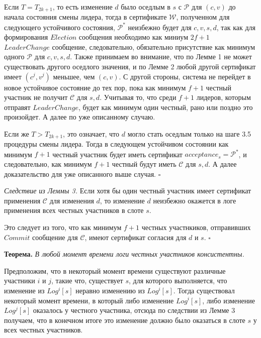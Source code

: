 Если $T= T_{2k+1}$, то есть изменение $d$ было оседлым в $s$ с $\mathcal{P}$ для $(c, v)$ до начала состояния смены лидера, тогда в сертификате $\mathcal{W}$, полученном для следующего устойчивого состояния, $\mathcal{P}^{*}$ неизбежно будет для $c, v, s, d$, так как для формирования $Election$ сообщения необходимо как миниум $2f+1$ $LeaderChange$ сообщение, следовательно, обязательно присутствие как минимум одного $\mathcal{P}$ для $c, v, s, d$. Также принимаем во внимание, что по Лемме 1 не может существовать другого оседлого значения, и по Лемме 2 любой другой сертификат имеет $(c^j, v^j)$ меньшее, чем $(c, v)$. С другой стороны, система не перейдет в новое устойчивое состояние до тех пор, пока как минимум $f+1$ честный участник не получит $\mathcal{C}$ для $s, d$. Учитывая то, что среди $f+1$ лидеров, которым отправят $LeaderChange$, будет как минимум один честный, рано или поздно это произойдет. А далее по уже описанному случаю.

Если же  $T > T_{2k+1}$, это означает, что $d$ могло стать оседлым только на шаге 3.5 процедуры смены лидера. Тогда в следующем устойчивом состоянии как минимум $f+1$ честный участник будет иметь сертификат $acceptance_s = \mathcal{P}^{*}$, и следовательно, как минимум $f+1$ честный будут иметь $\mathcal{C}$ для $s, d$. А далее доказательство для уже описанного выше случая.
$\square$
\vspace{10pt}

\textit{Следствие из Леммы 3.} Если хотя бы один честный участник имеет сертификат применения $\mathcal{C}$ для изменения $d$, то  изменение $d$ неизбежно окажется в логе применения всех честных участников в слоте $s$. 

Это следует из того, что как минимум $f+1$ честных участнкиков, отправивших $Commit$ сообщение для $\mathcal{C}$, имеют сертификат согласия для $d$ и $s$. $\square$
\vspace{10pt}

\textbf{Теорема.} \textit{В любой момент времени логи честных участников консистентны.}

Предположим, что в некоторый момент времени существуют различные участники $i$ и $j$, такие что, существует $s$, для которого выполняется, что изменение из $Log^i[s]$ неравно изменению из $Log^i[s]$. Тогда существовал некоторый момент времени, в который либо изменение $Log^i[s]$, либо изменение $Log^j[s]$ оказалось у честного участника, отсюда по следствии из Лемме 3 получаем, что в конечном итоге это изменение должно было оказаться в слоте $s$ у всех честных участников.

